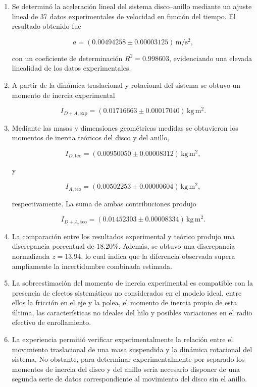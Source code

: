 \documentclass[11pt,a4paper]{article}
\begin{document}
\begin{enumerate}

    \item Se determinó la aceleración lineal del sistema disco--anillo
    mediante un ajuste lineal de 37 datos experimentales de velocidad
    en función del tiempo. El resultado obtenido fue

    \[
    a=(0.00494258\pm0.00003125)\,\mathrm{m/s^2},
    \]

    con un coeficiente de determinación \(R^2=0.998603\), evidenciando
    una elevada linealidad de los datos experimentales.

    \item A partir de la dinámica traslacional y rotacional del sistema
    se obtuvo un momento de inercia experimental

    \[
    I_{D+A,\mathrm{exp}}
    =
    (0.01716663\pm0.00017040)\,\mathrm{kg\,m^2}.
    \]

    \item Mediante las masas y dimensiones geométricas medidas se
    obtuvieron los momentos de inercia teóricos del disco y del anillo,

    \[
    I_{D,\mathrm{teo}}
    =
    (0.00950050\pm0.00008312)\,\mathrm{kg\,m^2},
    \]

    y

    \[
    I_{A,\mathrm{teo}}
    =
    (0.00502253\pm0.00000604)\,\mathrm{kg\,m^2},
    \]

    respectivamente. La suma de ambas contribuciones produjo

    \[
    I_{D+A,\mathrm{teo}}
    =
    (0.01452303\pm0.00008334)\,\mathrm{kg\,m^2}.
    \]

    \item La comparación entre los resultados experimental y teórico
    produjo una discrepancia porcentual de \(18.20\%\). Además, se
    obtuvo una discrepancia normalizada \(z=13.94\), lo cual indica que
    la diferencia observada supera ampliamente la incertidumbre
    combinada estimada.

    \item La sobreestimación del momento de inercia experimental es
    compatible con la presencia de efectos sistemáticos no considerados
    en el modelo ideal, entre ellos la fricción en el eje y la polea,
    el momento de inercia propio de esta última, las características
    no ideales del hilo y posibles variaciones en el radio efectivo de
    enrollamiento.

    \item La experiencia permitió verificar experimentalmente la
    relación entre el movimiento traslacional de una masa suspendida y
    la dinámica rotacional del sistema. No obstante, para determinar
    experimentalmente por separado los momentos de inercia del disco y
    del anillo sería necesario disponer de una segunda serie de datos
    correspondiente al movimiento del disco sin el anillo.

\end{enumerate}
\end{document}
